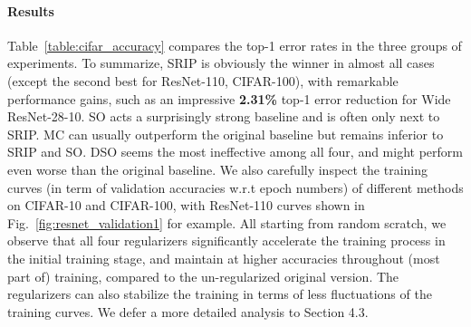 \documentclass{article}
\begin{document}
\vspace{-0.8em}
\paragraph{Results}
Table~\ref{table:cifar_accuracy} compares the top-1 error rates in the three groups of experiments. To summarize, SRIP is obviously the winner in almost all cases (except the second best for ResNet-110, CIFAR-100), with remarkable performance gains, such as an impressive \textbf{2.31\%} top-1 error reduction for Wide ResNet-28-10. SO acts a surprisingly strong baseline and is often only next to SRIP. MC can usually outperform the original baseline but remains inferior to SRIP and SO. DSO seems the most ineffective among all four, and might perform even worse than the original baseline. We also carefully inspect the training curves (in term of validation accuracies w.r.t epoch numbers) of different methods on CIFAR-10 and CIFAR-100, with ResNet-110 curves shown in Fig.~\ref{fig:resnet_validation1} for example. All starting from random scratch, we observe that all four regularizers significantly accelerate the training process in the initial training stage, and maintain at higher accuracies throughout (most part of) training, compared to the un-regularized original version. The regularizers can also stabilize the training in terms of less fluctuations of the training curves. We defer a more detailed analysis to Section 4.3.
\end{document}
